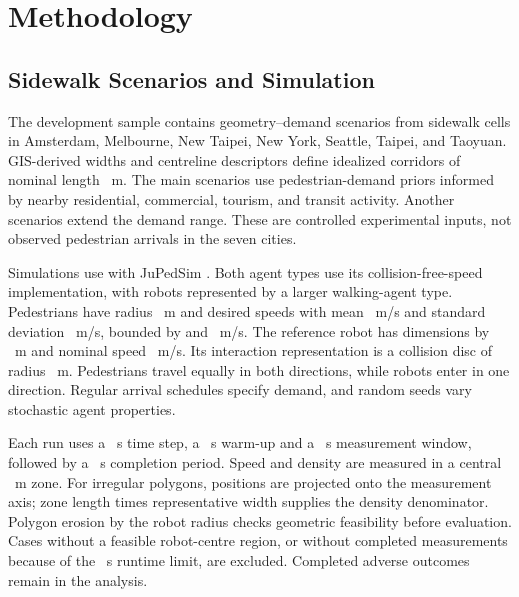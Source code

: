 \documentclass[NewProceedings,letterpaper]{ascelike-new}
\begin{document}
\section{Methodology}
\subsection{Sidewalk Scenarios and Simulation}
The development sample contains \Candidates{} geometry--demand scenarios from \Cells{} sidewalk cells in Amsterdam, Melbourne, New Taipei, New York, Seattle, Taipei, and Taoyuan. GIS-derived widths and centreline descriptors define idealized corridors of nominal length \CorridorLength{}~m. The \MainScenarios{} main scenarios use pedestrian-demand priors informed by nearby residential, commercial, tourism, and transit activity. Another \AdditionalScenarios{} scenarios extend the demand range. These are controlled experimental inputs, not observed pedestrian arrivals in the seven cities.

Simulations use \EngineVersion{} with JuPedSim \cite{Lopez2018}. Both agent types use its collision-free-speed implementation, with robots represented by a larger walking-agent type. Pedestrians have radius \PedRadius{}~m and desired speeds with mean \PedSpeed{}~m/s and standard deviation \PedSD{}~m/s, bounded by \PedMin{} and \PedMax{}~m/s. The reference robot has dimensions \RobotLength{} by \RobotWidth{}~m and nominal speed \RobotSpeed{}~m/s. Its interaction representation is a collision disc of radius \RobotRadius{}~m. Pedestrians travel equally in both directions, while robots enter in one direction. Regular arrival schedules specify demand, and random seeds vary stochastic agent properties.

Each run uses a \TimeStep{}~s time step, a \Warmup{}~s warm-up and a \Measurement{}~s measurement window, followed by a \Tail{}~s completion period. Speed and density are measured in a central \ZoneLength{}~m zone. For irregular polygons, positions are projected onto the measurement axis; zone length times representative width supplies the density denominator. Polygon erosion by the robot radius checks geometric feasibility before evaluation. Cases without a feasible robot-centre region, or without completed measurements because of the \Timeout{}~s runtime limit, are excluded. Completed adverse outcomes remain in the analysis.
\end{document}
